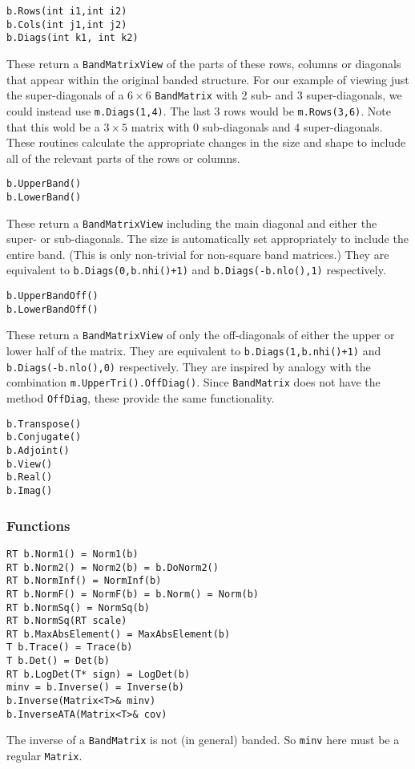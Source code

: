 \documentclass[twoside,letterpaper,11pt]{article}
\renewcommand{\tt}[1]{{\texttt {#1}}}
\begin{document}
\begin{verbatim}
b.Rows(int i1,int i2)
b.Cols(int j1,int j2)
b.Diags(int k1, int k2)
\end{verbatim}
These return a \tt{BandMatrixView} of the parts of these rows,
columns or diagonals that
appear within the original banded structure.  For our example of viewing just
the super-diagonals of a $6 \times 6$ \tt{BandMatrix} with 2 sub- and 
3 super-diagonals, we
could instead use \tt{m.Diags(1,4)}.  The last 3 rows would be \tt{m.Rows(3,6)}.
Note that this wold be a $3 \times 5$ matrix with 0 sub-diagonals and 
4 super-diagonals.
These routines calculate the appropriate changes in the size and shape to include
all of the relevant parts of the rows or columns.

\begin{verbatim}
b.UpperBand()
b.LowerBand()
\end{verbatim}
These return a \tt{BandMatrixView} including the main diagonal and either the
super- or sub-diagonals.  The size
is automatically set appropriately to include the entire band.  (This is only
non-trivial for non-square band matrices.)  They are equivalent to
\tt{b.Diags(0,b.nhi()+1)} and \tt{b.Diags(-b.nlo(),1)} respectively.

\begin{verbatim}
b.UpperBandOff()
b.LowerBandOff()
\end{verbatim}
These return a \tt{BandMatrixView} of only the off-diagonals of either the
upper or lower half of the matrix.  They are equivalent to
\tt{b.Diags(1,b.nhi()+1)} and \tt{b.Diags(-b.nlo(),0)} respectively.  
They are inspired by analogy with the combination \tt{m.UpperTri().OffDiag()}.
Since \tt{BandMatrix} does not have the method \tt{OffDiag}, these provide
the same functionality.

\begin{verbatim}
b.Transpose()
b.Conjugate()
b.Adjoint()
b.View()
b.Real()
b.Imag()
\end{verbatim}

\subsubsection{Functions}

\begin{verbatim}
RT b.Norm1() = Norm1(b)
RT b.Norm2() = Norm2(b) = b.DoNorm2()
RT b.NormInf() = NormInf(b)
RT b.NormF() = NormF(b) = b.Norm() = Norm(b)
RT b.NormSq() = NormSq(b)
RT b.NormSq(RT scale)
RT b.MaxAbsElement() = MaxAbsElement(b)
T b.Trace() = Trace(b)
T b.Det() = Det(b)
RT b.LogDet(T* sign) = LogDet(b)
minv = b.Inverse() = Inverse(b)
b.Inverse(Matrix<T>& minv)
b.InverseATA(Matrix<T>& cov)
\end{verbatim}
The inverse of a \tt{BandMatrix} is not (in general) banded.  So \tt{minv} here
must be a regular \tt{Matrix}.
\end{document}
